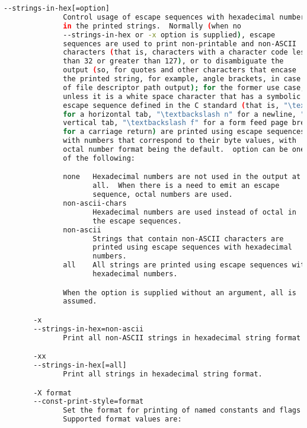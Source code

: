 {{\begin{lstlisting}[language=bash]
       --strings-in-hex[=option]
              Control usage of escape sequences with hexadecimal numbers
              in the printed strings.  Normally (when no
              --strings-in-hex or -x option is supplied), escape
              sequences are used to print non-printable and non-ASCII
              characters (that is, characters with a character code less
              than 32 or greater than 127), or to disambiguate the
              output (so, for quotes and other characters that encase
              the printed string, for example, angle brackets, in case
              of file descriptor path output); for the former use case,
              unless it is a white space character that has a symbolic
              escape sequence defined in the C standard (that is, "\textbackslash t"
              for a horizontal tab, "\textbackslash n" for a newline, "\textbackslash v" for a
              vertical tab, "\textbackslash f" for a form feed page break, and "\textbackslash r"
              for a carriage return) are printed using escape sequences
              with numbers that correspond to their byte values, with
              octal number format being the default.  option can be one
              of the following:

              none   Hexadecimal numbers are not used in the output at
                     all.  When there is a need to emit an escape
                     sequence, octal numbers are used.
              non-ascii-chars
                     Hexadecimal numbers are used instead of octal in
                     the escape sequences.
              non-ascii
                     Strings that contain non-ASCII characters are
                     printed using escape sequences with hexadecimal
                     numbers.
              all    All strings are printed using escape sequences with
                     hexadecimal numbers.

              When the option is supplied without an argument, all is
              assumed.

       -x
       --strings-in-hex=non-ascii
              Print all non-ASCII strings in hexadecimal string format.

       -xx
       --strings-in-hex[=all]
              Print all strings in hexadecimal string format.

       -X format
       --const-print-style=format
              Set the format for printing of named constants and flags.
              Supported format values are:


\end{lstlisting}}}
